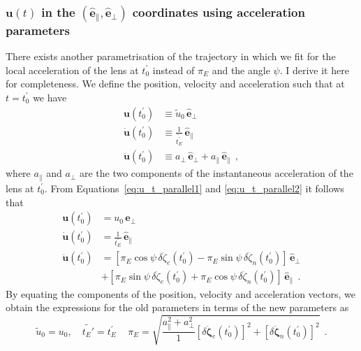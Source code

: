 \documentclass[12pt,dvipsnames]{report}
\newcommand{\hquad}{~~}
\begin{document}
\subsubsection{$\mathbf{u}(t)$ in the $(\mathbf{\hat e}_\parallel, \mathbf{\hat e}_\bot)$ coordinates using acceleration parameters} 
There exists another parametrisation of the trajectory in which we fit for the local
acceleration of the lens at $t_0^\prime$ instead of $\pi_E$ and the angle $\psi$. 
I derive it here for completeness.
We define the position, velocity and acceleration such that at $t=t_0^\prime$ we have
\begin{align}
    \mathbf{u}(t_0^\prime)       & \equiv \widetilde{u}_0 \,\hat{\mathbf e}_\bot
    \label{eq:u_primed_def}                                               \\
    \dot{\mathbf{u}}(t_0^\prime) & \equiv \frac{1}{\widetilde{t_E^\prime}}\,
    \hat{\mathbf e}_\parallel \label{eq:u_dot_primed_def}                 \\ \ddot{\mathbf{u}}(t_0^\prime) & \equiv
       a_\bot\,\hat{\mathbf e}_\bot + a_\parallel\,\hat{\mathbf e}_\parallel \label{eq:u_ddot_primed_def}
       \hquad,
\end{align}
where $a_\parallel$ and $a_\bot$ are the two components of the instantaneous acceleration of
the lens at $t_0^\prime$. From Equations~\ref{eq:u_t_parallel1} and
\ref{eq:u_t_parallel2} it follows that
\begin{align}
    \mathbf{u}(t_0^\prime)       & = u_0\,\hat{\mathbf e}_\bot                    \\
    \dot{\mathbf{u}}(t_0^\prime) & =\frac{1}{t_E^\prime}\,\hat{\mathbf e}_\parallel     \\ \ddot{\mathbf{u}}(t_0^\prime) &
       =\left[\pi_E\cos\psi\,\delta\ddot{\zeta}_e(t_0^\prime)
    -\pi_E\sin\psi\,\delta\ddot{\zeta}_n(t_0^\prime)\right]\,\hat{\mathbf e}_\bot \\  &
       +\left[\pi_E\sin\psi\,\delta\ddot{\zeta}_e(t_0^\prime)
           +\pi_E\cos\psi\,\delta\ddot{\zeta}_n(t_0^\prime)\right]\,\hat{\mathbf e}_\parallel
           \hquad.
\end{align}
By equating the components of the position, velocity and acceleration vectors, we obtain the expressions for the old parameters in terms of the new parameters as
\begin{equation}
    \widetilde{u}_0=u_0,\quad \widetilde{t_E'}=t_E^\prime\,\quad
    \pi_E=\sqrt{\frac{a_\parallel^2 + a_\bot^2}{1} \left[\delta\ddot{\boldsymbol{\zeta}}_e(t_0^\prime)\right]^2 +
        \left[\delta\ddot{\boldsymbol{\zeta}}_n(t_0^\prime)\right]^2}
        \hquad.
\end{equation}
\end{document}
